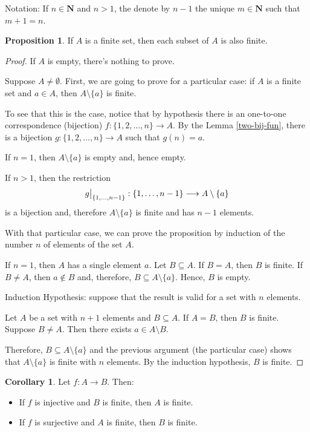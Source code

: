\documentclass[12pt,a4paper]{article}
\theoremstyle{definition}
\newtheorem{corollary}[theorem]{Corollary}
\newtheorem{proposition}[theorem]{Proposition}
\newcommand\restr[2]{{%
  \left.\kern-\nulldelimiterspace %
  #1 %
  \vphantom{\big|} %
  \right|_{#2} %
  }}
\begin{document}
Notation: If $n \in \textbf{N}$ and $n > 1$, the denote by $n-1$ the unique $m \in \textbf{N}$ such that $m+1 = n$.

\begin{proposition}\label{finite-subset}
	If $A$ is a finite set, then each subset of $A$ is also finite.
\end{proposition}

\begin{proof}
	If $A$ is empty, there's nothing to prove.
	
	Suppose $A \neq \emptyset$. First, we are going to prove for a particular case: if $A$ is a finite set and $a \in A$, then $A \setminus \{ a \}$ is finite.
	
	To see that this is the case, notice that by hypothesis there is an one-to-one correspondence (bijection) $f : \{ 1, 2, \ldots, n \} \longrightarrow A$. By the Lemma \ref{two-bij-fun}, there is a bijection $g : \{ 1, 2, \ldots, n \} \longrightarrow A$ such that $g(n) = a$.
	
	If $n=1$, then $A \setminus \{ a \}$ is empty and, hence empty.
	
	If $n > 1$, then the restriction
	\[
	\restr{g}{\{ 1, \ldots, n-1 \}} : \{ 1, \ldots, n-1 \} \longrightarrow A \setminus \{ a \}
	\]
	is a bijection and, therefore $A \setminus \{ a \}$ is finite and has $n-1$ elements. 
	
	With that particular case, we can prove the proposition by induction of the number $n$ of elements of the set $A$.
	
	If $n=1$, then $A$ has a single element $a$. Let $B \subseteq A$. If $B=A$, then $B$ is finite. If $B \neq A$, then $a \notin B$ and, therefore, $B \subseteq A \setminus \{ a \}$. Hence, $B$ is empty. 
	
	Induction Hypothesis: suppose that the result is valid for a set with $n$ elements. 
	
	Let $A$ be a set with $n+1$ elements and $B \subseteq A$. If $A=B$, then $B$ is finite. Suppose $B \neq A$. Then there exists $a \in A \setminus B$.
	
	Therefore, $B \subseteq A \setminus \{ a \}$ and the previous argument (the particular case) shows that $A \setminus \{ a \}$ is finite with $n$ elements. By the induction hypothesis, $B$ is finite.
\end{proof}

\begin{corollary}\label{cor:injsurfin}
	Let $f : A \longrightarrow B$. Then:
	\begin{itemize}
		\item If $f$ is injective and $B$ is finite, then $A$ is finite. 
		\item If $f$ is surjective and $A$ is finite, then $B$ is finite.
	\end{itemize}
\end{corollary}
\end{document}
